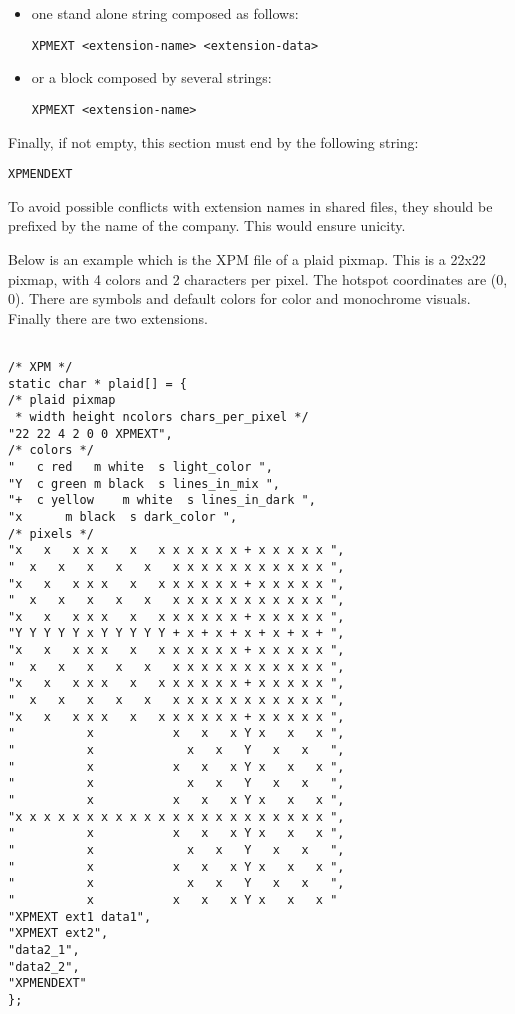 \begin{itemize}
\item[] one stand alone string composed as follows:

{\tt XPMEXT <extension-name> <extension-data>}

\item[] or a block composed by several strings:

{\tt XPMEXT <extension-name>}

{\tt <related extension-data composed of several strings>}

\end{itemize}

Finally, if not empty, this section must end by the following string:

{\tt XPMENDEXT}

To avoid possible conflicts with extension names in shared files, they should
be prefixed by the name of the company. This would ensure unicity.

\vspace{0.5cm}
Below is an example which is the XPM file of a plaid pixmap. This is a 22x22
pixmap, with 4 colors and 2 characters per pixel. The hotspot coordinates are
(0, 0). There are symbols and default colors for color and monochrome visuals.
Finally there are two extensions.

{\small \begin{verbatim}

/* XPM */
static char * plaid[] = {
/* plaid pixmap 
 * width height ncolors chars_per_pixel */
"22 22 4 2 0 0 XPMEXT",
/* colors */
"   c red 	m white  s light_color ",
"Y  c green	m black  s lines_in_mix ",
"+  c yellow	m white  s lines_in_dark ",
"x 		m black  s dark_color ",
/* pixels */
"x   x   x x x   x   x x x x x x + x x x x x ", 
"  x   x   x   x   x   x x x x x x x x x x x ", 
"x   x   x x x   x   x x x x x x + x x x x x ", 
"  x   x   x   x   x   x x x x x x x x x x x ", 
"x   x   x x x   x   x x x x x x + x x x x x ", 
"Y Y Y Y Y x Y Y Y Y Y + x + x + x + x + x + ", 
"x   x   x x x   x   x x x x x x + x x x x x ", 
"  x   x   x   x   x   x x x x x x x x x x x ", 
"x   x   x x x   x   x x x x x x + x x x x x ", 
"  x   x   x   x   x   x x x x x x x x x x x ", 
"x   x   x x x   x   x x x x x x + x x x x x ", 
"          x           x   x   x Y x   x   x ", 
"          x             x   x   Y   x   x   ",
"          x           x   x   x Y x   x   x ", 
"          x             x   x   Y   x   x   ", 
"          x           x   x   x Y x   x   x ", 
"x x x x x x x x x x x x x x x x x x x x x x ", 
"          x           x   x   x Y x   x   x ", 
"          x             x   x   Y   x   x   ", 
"          x           x   x   x Y x   x   x ", 
"          x             x   x   Y   x   x   ", 
"          x           x   x   x Y x   x   x "
"XPMEXT ext1 data1",
"XPMEXT ext2",
"data2_1",
"data2_2",
"XPMENDEXT"
};

\end{verbatim}}

